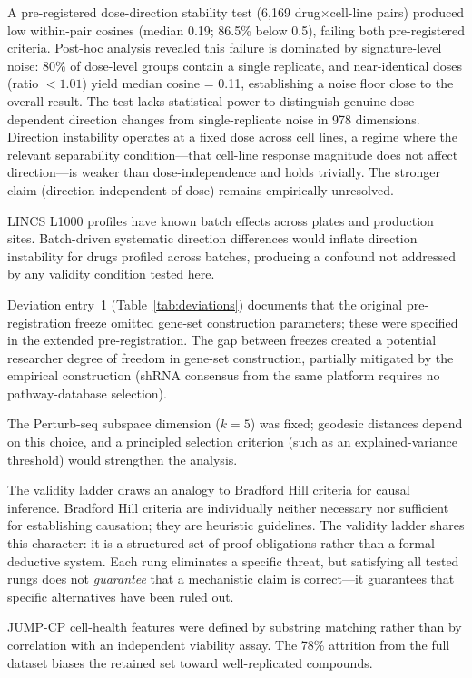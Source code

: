 \documentclass[11pt]{article}
\begin{document}
A pre-registered dose-direction stability test (6{,}169
drug$\times$cell-line pairs) produced low within-pair cosines (median
0.19; 86.5\% below 0.5), failing both pre-registered criteria. Post-hoc
analysis revealed this failure is dominated by signature-level noise:
80\% of dose-level groups contain a single replicate, and
near-identical doses (ratio $< 1.01$) yield median cosine = 0.11,
establishing a noise floor close to the overall result. The test lacks
statistical power to distinguish genuine dose-dependent direction
changes from single-replicate noise in 978 dimensions.
Direction instability operates at a fixed dose across cell lines, a
regime where the relevant separability condition---that cell-line
response magnitude does not affect direction---is weaker than
dose-independence and holds trivially. The stronger claim (direction
independent of dose) remains empirically unresolved.

LINCS L1000 profiles have known batch effects across plates and
production sites. Batch-driven systematic direction differences would
inflate direction instability for drugs profiled across batches,
producing a confound not addressed by any validity condition tested here.

Deviation entry~1 (Table~\ref{tab:deviations}) documents that the
original pre-registration freeze omitted gene-set construction parameters;
these were specified in the extended pre-registration. The gap between
freezes created a potential researcher degree of freedom in gene-set
construction, partially mitigated by the empirical construction (shRNA
consensus from the same platform requires no pathway-database selection).

The Perturb-seq subspace dimension ($k = 5$) was fixed; geodesic
distances depend on this choice, and a principled selection criterion
(such as an explained-variance threshold) would strengthen the analysis.

The validity ladder draws an analogy to Bradford Hill criteria for causal
inference. Bradford Hill criteria are individually neither necessary nor
sufficient for establishing causation; they are heuristic guidelines. The
validity ladder shares this character: it is a structured set of proof
obligations rather than a formal deductive system. Each rung eliminates
a specific threat, but satisfying all tested rungs does not
\emph{guarantee} that a mechanistic claim is correct---it guarantees
that specific alternatives have been ruled out.

JUMP-CP cell-health features were defined by substring matching rather
than by correlation with an independent viability assay. The 78\% attrition
from the full dataset biases the retained set toward well-replicated
compounds.
\end{document}
